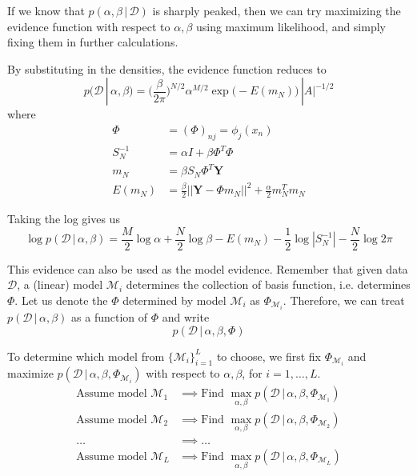 \documentclass{article}
\begin{document}
    If we know that $p(\alpha, \beta \,|\,\mathcal{D})$ is sharply peaked, then we can try maximizing the evidence function with respect to $\alpha, \beta$ using maximum likelihood, and simply fixing them in further calculations.

    By substituting in the densities, the evidence function reduces to
    \begin{equation}
      p(\mathcal{D}\,|\,\alpha, \beta) = \bigg(\frac{\beta}{2 \pi}\bigg)^{N/2} \alpha^{M/2} \exp\big( -E (m_N)\big) \,|A|^{-1/2}
    \end{equation}
    where
    \begin{align*}
      \Phi & = (\Phi)_{nj} = \phi_j (x_n) \\
      S_N^{-1} & = \alpha I + \beta \Phi^T \Phi \\
      m_N & = \beta S_N \Phi^T \mathbf{Y} \\
      E(m_N) & = \frac{\beta}{2} ||\mathbf{Y} - \Phi m_N||^2 + \frac{\alpha}{2} m_N^T m_N
    \end{align*}

    Taking the log gives us
    \begin{equation}
      \log{p(\mathcal{D}\,|\,\alpha, \beta)} = \frac{M}{2}\log{\alpha} + \frac{N}{2} \log{\beta} - E(m_N) - \frac{1}{2} \log{|S_N^{-1}|} - \frac{N}{2} \log{2 \pi}
    \end{equation}

    This evidence can also be used as the model evidence. Remember that given data $\mathcal{D}$, a (linear) model $\mathcal{M}_i$ determines the collection of basis function, i.e. determines $\Phi$. Let us denote the $\Phi$ determined by model $\mathcal{M}_i$ as $\Phi_{\mathcal{M}_i}$. Therefore, we can treat $p(\mathcal{D}\,|\,\alpha, \beta)$ as a function of $\Phi$ and write
    \begin{equation}
      p(\mathcal{D}\,|\,\alpha, \beta, \Phi)
    \end{equation}

    To determine which model from $\{\mathcal{M}_i\}_{i=1}^L$ to choose, we first fix $\Phi_{\mathcal{M}_i}$ and maximize $p(\mathcal{D}\,|\,\alpha, \beta, \Phi_{\mathcal{M}_i})$ with respect to $\alpha, \beta$, for $i = 1, \ldots, L$.
    \begin{align*}
      \text{Assume model } \mathcal{M}_1 & \implies \text{Find } \max_{\alpha, \beta} p(\mathcal{D}\,|\,\alpha, \beta, \Phi_{\mathcal{M}_1}) \\
      \text{Assume model } \mathcal{M}_2 & \implies \text{Find } \max_{\alpha, \beta} p(\mathcal{D}\,|\,\alpha, \beta, \Phi_{\mathcal{M}_2}) \\
      \ldots & \implies \ldots \\
      \text{Assume model } \mathcal{M}_L & \implies \text{Find } \max_{\alpha, \beta} p(\mathcal{D}\,|\,\alpha, \beta, \Phi_{\mathcal{M}_L})
    \end{align*}
\end{document}
